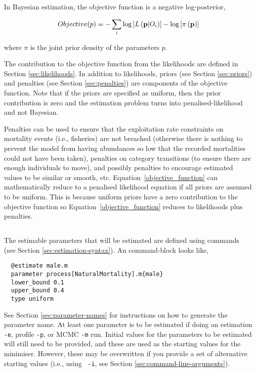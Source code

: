 In Bayesian estimation, the objective function is a negative log-posterior,

\begin{equation}\label{objective_function}
Objective(p)= - \sum\limits_i {\log \left[ {L\left( {{\bf{p}}|O_i } \right)} \right]}  - \log \left[ {\pi \left( {\bf{p}} \right)} \right]
\end{equation}

where $\pi$ is the joint prior density of the parameters $p$.

The contribution to the objective function from the likelihoods are defined in Section \ref{sec:likelihoods}. In addition to likelihoods, priors (see Section \ref{sec:priors}) and penalties (see Section \ref{sec:penalties}) are components of the objective function. Note that if the priors are specified as uniform, then the prior contribution is zero and the estimation problem turns into penalised-likelihood and not Bayesian.

Penalties can be used to ensure that the exploitation rate constraints on mortality events (i.e., fisheries) are not breached (otherwise there is nothing to prevent the model from having abundances so low that the recorded mortalities could not have been taken), penalties on category transitions (to ensure there are enough individuals to move), and possibly penalties to encourage estimated values to be similar or smooth, etc. Equation~\ref{objective_function} can mathematically reduce to a penalised likelihood equation if all priors are assumed to be uniform. This is because uniform priors have a zero contribution to the objective function so Equation~\ref{objective_function} reduces to likelihoods plus penalties.

\subsection{\label{sec:estimate-free-parameters}}
The estimable parameters that will be estimated are defined using  commands (see Section \ref{sec:estimation-syntax}). An  command-block looks like,

{\small{\begin{verbatim}
  @estimate male.m
  parameter process[NaturalMortality].m{male}
  lower_bound 0.1
  upper_bound 0.4
  type uniform
\end{verbatim}}}

See Section \ref{sec:parameter-names} for instructions on how to generate the parameter name. At least one parameter is to be estimated if doing an estimation \texttt{-e}, profile \texttt{-p}, or MCMC \texttt{-m} run. Initial values for the parameters to be estimated will still need to be provided, and these are used as the starting values for the minimiser. However, these may be overwritten if you provide a set of alternative starting values (i.e., using  \texttt{\cname\ -i}, see Section \ref{sec:command-line-arguments}).

